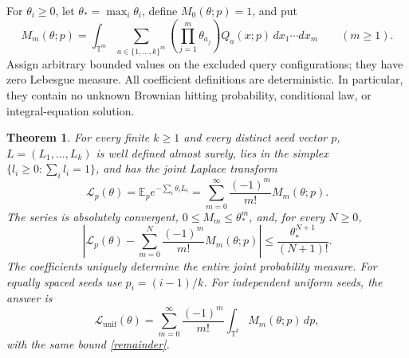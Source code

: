 \documentclass[11pt]{article}
\newtheorem{theorem}{Theorem}
\newcommand{\T}{\mathbb T}
\newcommand{\E}{\mathbb E}
\begin{document}
For $\theta_i\geq0$, let $\theta_*=\max_i\theta_i$, define
$M_0(\theta;p)=1$, and put
\begin{equation}\label{moments}
 M_m(\theta;p)=\int_{\T^m}
 \sum_{a\in\{1,\ldots,k\}^m}
 \left(\prod_{j=1}^m\theta_{a_j}\right)Q_a(x;p)
 \,dx_1\cdots dx_m\qquad(m\geq1).
\end{equation}
Assign arbitrary bounded values on the excluded query configurations;
they have zero Lebesgue measure. All coefficient definitions are
deterministic. In particular, they contain no unknown Brownian hitting
probability, conditional law, or integral-equation solution.

\begin{theorem}\label{main}
For every finite $k\geq1$ and every distinct seed vector $p$,
$L=(L_1,\ldots,L_k)$ is well defined almost surely, lies in the simplex
$\{l_i\geq0:\sum_i l_i=1\}$, and has the joint Laplace transform
\begin{equation}\label{transform}
 \mathcal L_p(\theta)=\E_p e^{-\sum_i\theta_iL_i}
       =\sum_{m=0}^{\infty}\frac{(-1)^m}{m!}M_m(\theta;p).
\end{equation}
The series is absolutely convergent, $0\leq M_m\leq\theta_*^m$, and,
for every $N\geq0$,
\begin{equation}\label{remainder}
 \left|\mathcal L_p(\theta)-\sum_{m=0}^{N}
                   \frac{(-1)^m}{m!}M_m(\theta;p)\right|
       \leq\frac{\theta_*^{N+1}}{(N+1)!}.
\end{equation}
The coefficients uniquely determine the entire joint probability
measure. For equally spaced seeds use $p_i=(i-1)/k$. For independent
uniform seeds, the answer is
\begin{equation}\label{uniform}
 \mathcal L_{\mathrm{unif}}(\theta)
 =\sum_{m=0}^{\infty}\frac{(-1)^m}{m!}
                    \int_{\T^k}M_m(\theta;p)\,dp,
\end{equation}
with the same bound \eqref{remainder}.
\end{theorem}
\end{document}
